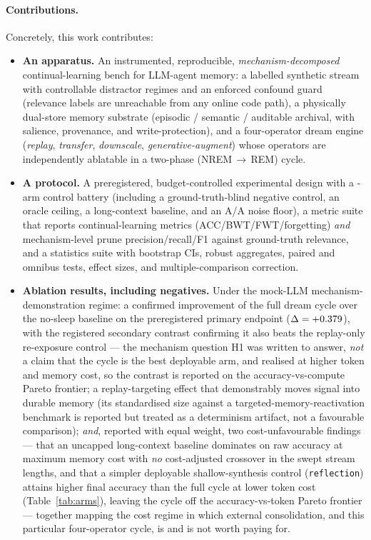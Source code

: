 \paragraph{Contributions.} Concretely, this work contributes:
\begin{itemize}
  \item \textbf{An apparatus.} An instrumented, reproducible, \emph{mechanism-decomposed}
  continual-learning bench for LLM-agent memory: a labelled synthetic stream
  with controllable distractor regimes and an enforced confound guard (relevance
  labels are unreachable from any online code path), a physically dual-store
  memory substrate (episodic / semantic / auditable archival, with salience,
  provenance, and write-protection), and a four-operator dream engine
  (\emph{replay}, \emph{transfer}, \emph{downscale}, \emph{generative-augment})
  whose operators are independently ablatable in a two-phase (NREM\,$\to$\,REM)
  cycle.
  \item \textbf{A protocol.} A preregistered, budget-controlled experimental design
  with a \SWnArms{}-arm control battery (including a ground-truth-blind negative
  control, an oracle ceiling, a long-context baseline, and an A/A noise floor),
  a metric suite that reports continual-learning metrics (ACC/BWT/FWT/forgetting)
  \emph{and} mechanism-level prune precision/recall/F1 against ground-truth
  relevance, and a statistics suite with bootstrap CIs, robust aggregates,
  paired and omnibus tests, effect sizes, and multiple-comparison correction.
  \item \textbf{Ablation results, including negatives.} Under the mock-LLM
  mechanism-demonstration regime: a confirmed improvement of the full dream cycle
  over the no-sleep baseline on the preregistered primary endpoint
  ($\Delta=+0.379$), with the registered secondary contrast confirming it
  also beats the replay-only re-exposure control --- the mechanism question H1 was
  written to answer, \emph{not} a claim that the cycle is the best deployable arm,
  and realised at higher token and memory cost, so the contrast is reported on the
  accuracy-vs-compute Pareto frontier; a replay-targeting effect that demonstrably
  moves signal into durable memory (its standardised size against a
  targeted-memory-reactivation benchmark is reported but treated as a determinism
  artifact, not a favourable comparison); \emph{and}, reported with equal weight,
  two cost-unfavourable findings --- that an uncapped long-context baseline
  dominates on raw accuracy at maximum memory cost with \emph{no} cost-adjusted crossover
  in the swept stream lengths, and that a simpler deployable shallow-synthesis
  control (\texttt{reflection}) attains higher final accuracy than the full cycle
  at lower token cost (Table~\ref{tab:arms}), leaving the cycle off the
  accuracy-vs-token Pareto frontier --- together mapping the cost regime in which
  external consolidation, and this particular four-operator cycle, is and is not
  worth paying for.
\end{itemize}
